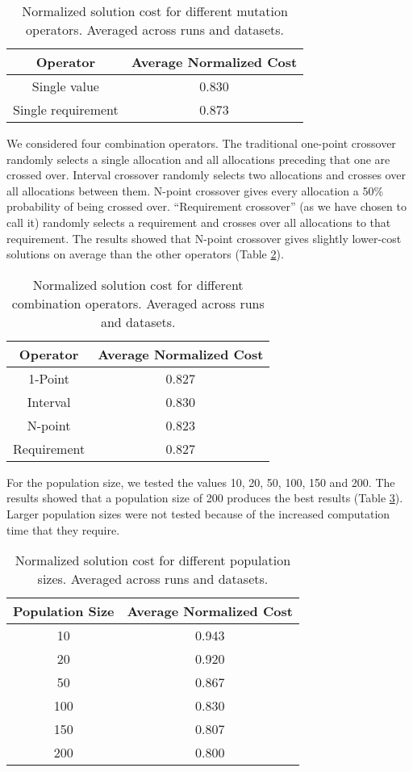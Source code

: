 \documentclass{sig-alternate}
\begin{document}
\begin{table}
	\centering
	\begin{tabular}{ | c | c | }
		\hline
		Operator & Average Normalized Cost \\ \hline
		Single value       & 0.830 \\ \hline
		Single requirement & 0.873 \\ \hline
	\end{tabular}
	\caption{Normalized solution cost for different mutation operators. Averaged across runs and datasets.}
	\label{table:gamutationoperatortests}
\end{table}

We considered four combination operators. The traditional one-point crossover randomly selects a single allocation and all allocations preceding that one are crossed over. Interval crossover randomly selects two allocations and crosses over all allocations between them. N-point crossover gives every allocation a 50\% probability of being crossed over. ``Requirement crossover'' (as we have chosen to call it) randomly selects a requirement and crosses over all allocations to that requirement. The results showed that N-point crossover gives slightly lower-cost solutions on average than the other operators (Table \ref{table:gacombinationnoperatortests}).

\begin{table}
	\centering
	\begin{tabular}{ | c | c | }
		\hline
		Operator & Average Normalized Cost \\ \hline
		1-Point    & 0.827 \\ \hline
		Interval   & 0.830 \\ \hline
		N-point    & 0.823 \\ \hline
		Requirement& 0.827 \\ \hline
	\end{tabular}
	\caption{Normalized solution cost for different combination operators. Averaged across runs and datasets.}
	\label{table:gacombinationnoperatortests}
\end{table}

For the population size, we tested the values 10, 20, 50, 100, 150 and 200. The results showed that a population size of 200 produces the best results (Table \ref{table:gapopsizetests}). Larger population sizes were not tested because of the increased computation time that they require.
\begin{table}
	\centering
	\begin{tabular}{ | c | c | }
		\hline
		Population Size & Average Normalized Cost \\ \hline
		10  & 0.943 \\ \hline
		20  & 0.920 \\ \hline
		50  & 0.867 \\ \hline
		100 & 0.830 \\ \hline
		150 & 0.807 \\ \hline
		200 & 0.800 \\ \hline
	\end{tabular}
	\caption{Normalized solution cost for different population sizes. Averaged across runs and datasets.}
	\label{table:gapopsizetests}
\end{table}
\end{document}
